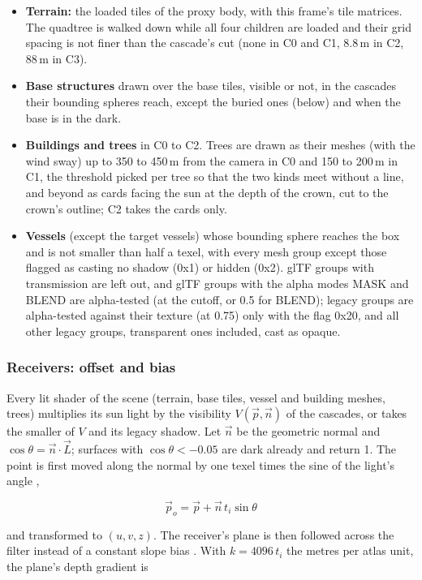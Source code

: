 \documentclass[Orbiter Technical Reference.tex]{subfiles}
\begin{document}
\begin{sloppypar}
\begin{itemize}
\item \textbf{Terrain:} the loaded tiles of the proxy body, with this frame's tile matrices. The quadtree is walked down while all four children are loaded and their grid spacing is not finer than the cascade's cut (none in C0 and C1, 8.8\,m in C2, 88\,m in C3).
\item \textbf{Base structures} drawn over the base tiles, visible or not, in the cascades their bounding spheres reach, except the buried ones (below) and when the base is in the dark.
\item \textbf{Buildings and trees} in C0 to C2. Trees are drawn as their meshes (with the wind sway) up to 350 to 450\,m from the camera in C0 and 150 to 200\,m in C1, the threshold picked per tree so that the two kinds meet without a line, and beyond as cards facing the sun at the depth of the crown, cut to the crown's outline; C2 takes the cards only.
\item \textbf{Vessels} (except the target vessels) whose bounding sphere reaches the box and is not smaller than half a texel, with every mesh group except those flagged as casting no shadow (0x1) or hidden (0x2). glTF groups with transmission are left out, and glTF groups with the alpha modes MASK and BLEND are alpha-tested (at the cutoff, or 0.5 for BLEND); legacy groups are alpha-tested against their texture (at 0.75) only with the flag 0x20, and all other legacy groups, transparent ones included, cast as opaque.
\end{itemize}


\subsubsection{Receivers: offset and bias}
Every lit shader of the scene (terrain, base tiles, vessel and building meshes, trees) multiplies its sun light by the visibility $V(\vec{p}, \vec{n})$ of the cascades, or takes the smaller of $V$ and its legacy shadow. Let $\vec{n}$ be the geometric normal and $\cos\theta = \vec{n} \cdot \vec{L}$; surfaces with $\cos\theta < -0.05$ are dark already and return 1. The point is first moved along the normal by one texel times the sine of the light's angle \cite{holbert2011},

\[ \vec{p}_{o} = \vec{p} + \vec{n}\,t_{i}\sin\theta \]

\noindent
and transformed to $(u, v, z)$. The receiver's plane is then followed across the filter instead of a constant slope bias \cite{isidoro2006}. With $k = 4096\,t_{i}$ the metres per atlas unit, the plane's depth gradient is


\end{sloppypar}
\end{document}
